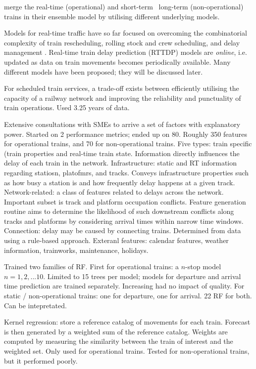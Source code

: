 \documentclass{article}
\begin{document}
\cite{nair_et_al_2019} merge the real-time (operational) and short-term \ long-term (non-operational) trains in their ensemble model by utilising different underlying models.

Models for real-time traffic have so far focused on overcoming the combinatorial complexity of train rescheduling, rolling stock and crew scheduling, and delay management \cite{kecman_corman_meng_2015}.
Real-time train delay prediction (RTTDP) models are \textit{online}, i.e. updated as data on train movements becomes periodically available.  Many different models have been proposed; they will be discussed later.

For scheduled train services, a trade-off exists between efficiently utilising the capacity of a railway network and improving the reliability and punctuality of train operations. Used 3.25 years of data. 

Extensive consultations with SMEs to arrive a set of factors with explanatory power. Started on 2 performance metrics; ended up on 80. Roughly 350 features for operational trains, and 70 for non-operational trains. Five types: train specific (train properties and real-time train state. Information directly influences the delay of each train in the network.
Infrastructure: static and RT information regarding statiosn, platofmrs, and tracks. Conveys infrastructure properties such as how busy a station is and how frequently delay happens at a given track.
Network-related: a class of features related to delays across the network. Important subset is track and platform occupation conflicts. Feature generation routine aims to determine the likelihood of such downstream 
conflicts along tracks and platforms by considering arrival times within narrow time windows. 
Connection: delay may be caused by connecting trains. Determined from data using a rule-based approach.
Exteranl features: calendar features, weather information, trainworks, maintenance, holidays.

Trained two families of RF. First for operational trains: a $n$-stop model $n = 1, 2, ... 10$. Limited to 15 trees per model; models for departure and arrival time prediction are trained separately. Increasing had no impact of quality. For static / non-operational trains: one for departure, one for arrival. 22 RF for both. Can be intepretated. 

Kernel regression: store a reference catalog of movements for each train. Forecast is then generated by a weighted sum of the reference catalog. Weights are computed by measuring the similarity between the train of interest and the weighted set. Only used for operational trains. Tested for non-operational trains, but it performed poorly. 
\end{document}
